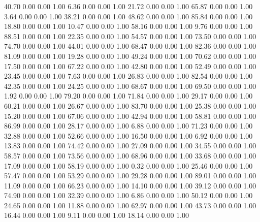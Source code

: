    40.70   0.00   0.00   1.00
    6.36   0.00   0.00   1.00
   21.72   0.00   0.00   1.00
   65.87   0.00   0.00   1.00
    3.64   0.00   0.00   1.00
   38.21   0.00   0.00   1.00
   48.62   0.00   0.00   1.00
   85.84   0.00   0.00   1.00
   18.80   0.00   0.00   1.00
   10.47   0.00   0.00   1.00
   58.16   0.00   0.00   1.00
    9.76   0.00   0.00   1.00
   88.51   0.00   0.00   1.00
   22.35   0.00   0.00   1.00
   54.57   0.00   0.00   1.00
   73.50   0.00   0.00   1.00
   74.70   0.00   0.00   1.00
   44.01   0.00   0.00   1.00
   68.47   0.00   0.00   1.00
   82.36   0.00   0.00   1.00
   81.09   0.00   0.00   1.00
   19.28   0.00   0.00   1.00
   49.24   0.00   0.00   1.00
   70.62   0.00   0.00   1.00
   17.50   0.00   0.00   1.00
   67.22   0.00   0.00   1.00
   42.80   0.00   0.00   1.00
   52.49   0.00   0.00   1.00
   23.45   0.00   0.00   1.00
    7.63   0.00   0.00   1.00
   26.83   0.00   0.00   1.00
   82.54   0.00   0.00   1.00
   42.35   0.00   0.00   1.00
   24.25   0.00   0.00   1.00
   68.67   0.00   0.00   1.00
   69.50   0.00   0.00   1.00
    1.92   0.00   0.00   1.00
   79.20   0.00   0.00   1.00
   71.84   0.00   0.00   1.00
   29.17   0.00   0.00   1.00
   60.21   0.00   0.00   1.00
   26.67   0.00   0.00   1.00
   83.70   0.00   0.00   1.00
   25.38   0.00   0.00   1.00
   15.20   0.00   0.00   1.00
   67.06   0.00   0.00   1.00
   42.94   0.00   0.00   1.00
   58.81   0.00   0.00   1.00
   86.99   0.00   0.00   1.00
   28.17   0.00   0.00   1.00
    6.88   0.00   0.00   1.00
   71.23   0.00   0.00   1.00
   32.88   0.00   0.00   1.00
   52.66   0.00   0.00   1.00
   16.50   0.00   0.00   1.00
    6.92   0.00   0.00   1.00
   13.83   0.00   0.00   1.00
   74.42   0.00   0.00   1.00
   27.09   0.00   0.00   1.00
   34.55   0.00   0.00   1.00
   58.57   0.00   0.00   1.00
   73.56   0.00   0.00   1.00
   68.96   0.00   0.00   1.00
   33.68   0.00   0.00   1.00
   17.09   0.00   0.00   1.00
   58.19   0.00   0.00   1.00
    0.32   0.00   0.00   1.00
   25.46   0.00   0.00   1.00
   57.47   0.00   0.00   1.00
   53.29   0.00   0.00   1.00
   29.28   0.00   0.00   1.00
   89.01   0.00   0.00   1.00
   11.09   0.00   0.00   1.00
   66.23   0.00   0.00   1.00
   14.10   0.00   0.00   1.00
   39.12   0.00   0.00   1.00
   74.90   0.00   0.00   1.00
   32.39   0.00   0.00   1.00
    6.86   0.00   0.00   1.00
   50.12   0.00   0.00   1.00
   24.65   0.00   0.00   1.00
   11.88   0.00   0.00   1.00
   62.97   0.00   0.00   1.00
   43.73   0.00   0.00   1.00
   16.44   0.00   0.00   1.00
    9.11   0.00   0.00   1.00
   18.14   0.00   0.00   1.00
